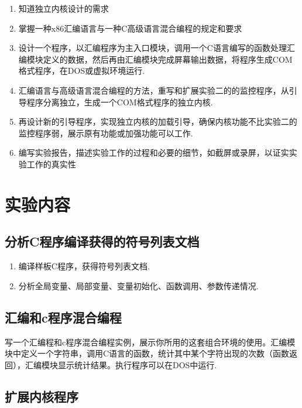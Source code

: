 \documentclass[a4paper, 11pt]{article} %
\begin{document}
\begin{enumerate}
  \item 知道独立内核设计的需求
  \item 掌握一种x86汇编语言与一种C高级语言混合编程的规定和要求
  \item 设计一个程序，以汇编程序为主入口模块，调用一个C语言编写的函数处理汇编模块定义的数据，然后再由汇编模块完成屏幕输出数据，将程序生成COM格式程序，在DOS或虚拟环境运行.
  \item 汇编语言与高级语言混合编程的方法，重写和扩展实验二的的监控程序，从引导程序分离独立，生成一个COM格式程序的独立内核.
  \item 再设计新的引导程序，实现独立内核的加载引导，确保内核功能不比实验二的监控程序弱，展示原有功能或加强功能可以工作.
  \item 编写实验报告，描述实验工作的过程和必要的细节，如截屏或录屏，以证实实验工作的真实性
\end{enumerate}

\section{实验内容}

\subsection{分析C程序编译获得的符号列表文档}

\begin{enumerate}
  \item 编译样板C程序，获得符号列表文档.
  \item 分析全局变量、局部变量、变量初始化、函数调用、参数传递情况.
\end{enumerate}

\subsection{汇编和c程序混合编程}

写一个汇编程和c程序混合编程实例，展示你所用的这套组合环境的使用。汇编模块中定义一个字符串，调用C语言的函数，统计其中某个字符出现的次数（函数返回），汇编模块显示统计结果。执行程序可以在DOS中运行.

\subsection{扩展内核程序}
\end{document}
